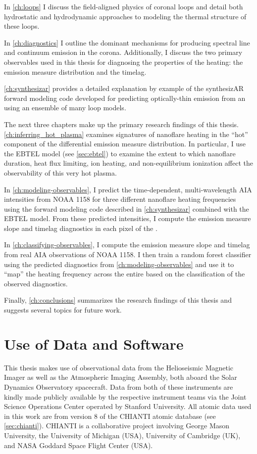 In \autoref{ch:loops} I discuss the field-aligned physics of coronal loops and detail both hydrostatic and hydrodynamic approaches to modeling the thermal structure of these loops.

In \autoref{ch:diagnostics} I outline the dominant mechanisms for producing spectral line and continuum emission in the corona. Additionally, I discuss the two primary observables used in this thesis for diagnosing the properties of the heating: the emission measure distribution and the timelag.

\autoref{ch:synthesizar} provides a detailed explanation by example of the synthesizAR forward modeling code developed for predicting optically-thin emission from an \AR{} using an ensemble of many loop models.

The next three chapters make up the primary research findings of this thesis. \autoref{ch:inferring_hot_plasma} examines signatures of nanoflare heating in the ``hot'' component of the differential emission measure distribution. In particular, I use the EBTEL model (see \autoref{sec:ebtel}) to examine the extent to which nanoflare duration, heat flux limiting, ion heating, and non-equilibrium ionization affect the observability of this very hot plasma.

In \autoref{ch:modeling-observables}, I predict the time-dependent, multi-wavelength AIA intensities from \AR{} NOAA 1158 for three different nanoflare heating frequencies using the forward modeling code described in \autoref{ch:synthesizar} combined with the EBTEL model. From these predicted intensities, I compute the emission measure slope and timelag diagnostics in each pixel of the \AR{}.

In \autoref{ch:classifying-observables}, I compute the emission measure slope and timelag from real AIA observations of \AR{} NOAA 1158. I then train a random forest classifier using the predicted diagnostics from \autoref{ch:modeling-observables} and use it to ``map'' the heating frequency across the entire \AR{} based on the classification of the observed diagnostics.

Finally, \autoref{ch:conclusions} summarizes the research findings of this thesis and suggests several topics for future work.

\section{Use of Data and Software}\label{sec:software-data}

This thesis makes use of observational data from the Helioseismic Magnetic Imager as well as the Atmospheric Imaging Assembly, both aboard the Solar Dynamics Observatory spacecraft. Data from both of these instruments are kindly made publicly available by the respective instrument teams via the Joint Science Operations Center \citep[JSOC,][]{couvidat_observables_2016} operated by Stanford University. All atomic data used in this work are from version 8 of the CHIANTI atomic database (see \autoref{sec:chianti}). CHIANTI is a collaborative project involving George Mason University, the University of Michigan (USA), University of Cambridge (UK), and NASA Goddard Space Flight Center (USA).

